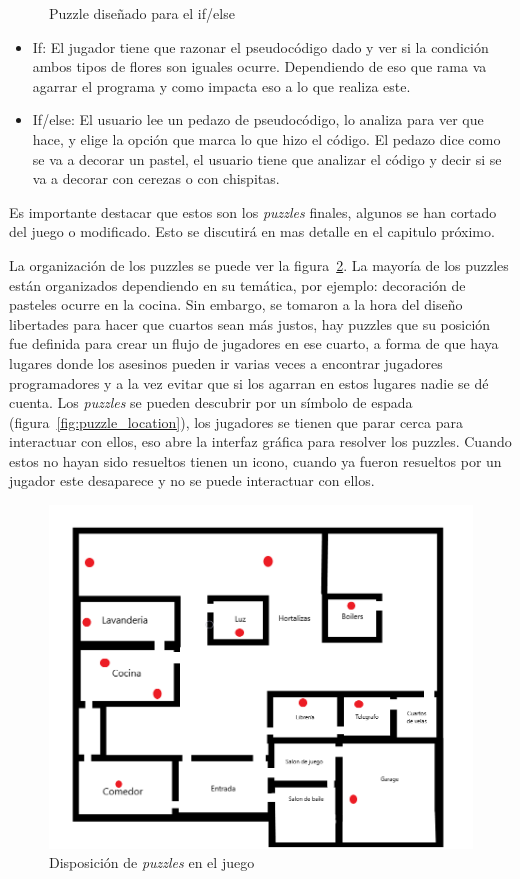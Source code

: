 \begin{itemize}
\begin{figure}[H]
                \caption{Puzzle diseñado para el if/else}
                \label{fig:if_else_puzzle}
            \end{figure}
    \begin{itemize}
        \item If: El jugador tiene que razonar el pseudocódigo dado y ver si la condición ambos tipos de flores son iguales ocurre. Dependiendo de eso que rama va agarrar el programa y como impacta eso a lo que realiza este.
        \item If/else: El usuario lee un pedazo de pseudocódigo, lo analiza para ver que hace, y elige la opción que marca lo que hizo el código. El pedazo dice como se va a decorar un pastel, el usuario tiene que analizar el código y decir si se va a decorar con cerezas o con chispitas.
    \end{itemize}
\end{itemize}

Es importante destacar que estos son los \textit{puzzles} finales, algunos se han cortado del juego o modificado. Esto se discutirá en mas detalle en el capitulo próximo. 

La organización de los puzzles se puede ver la figura~\ref{fig:items_on_map}. La mayoría de los puzzles están organizados dependiendo en su temática, por ejemplo: decoración de pasteles ocurre en la cocina. Sin embargo, se tomaron a la hora del diseño libertades para hacer que cuartos sean más justos, hay puzzles que su posición fue definida para crear un flujo de jugadores en ese cuarto, a forma de que haya lugares donde los asesinos pueden ir varias veces a encontrar jugadores programadores y a la vez evitar que si los agarran en estos lugares nadie se dé cuenta.
Los \textit{puzzles} se pueden descubrir por un símbolo de espada (figura~\ref{fig:puzzle_location}), los jugadores se tienen que parar cerca para interactuar con ellos, eso abre la interfaz gráfica para resolver los puzzles. Cuando estos no hayan sido resueltos tienen un icono, cuando ya fueron resueltos por un jugador este desaparece y no se puede interactuar con ellos.

\begin{figure}[H]
    \centering
    \includegraphics[width=0.5\linewidth]{images/MapaJuegoConItems.png}
    \caption{Disposición de \textit{puzzles} en el juego}
    \label{fig:items_on_map}
\end{figure}

